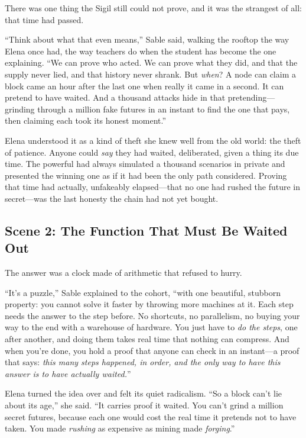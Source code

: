\documentclass[12pt,letterpaper]{book}
\begin{document}
There was one thing the Sigil still could not prove, and it was the strangest of
all: that time had passed.

``Think about what that even means,'' Sable said, walking the rooftop the way Elena
once had, the way teachers do when the student has become the one explaining. ``We
can prove who acted. We can prove what they did, and that the supply never lied, and
that history never shrank. But \emph{when}? A node can claim a block came an hour
after the last one when really it came in a second. It can pretend to have waited.
And a thousand attacks hide in that pretending---grinding through a million fake
futures in an instant to find the one that pays, then claiming each took its honest
moment.''

Elena understood it as a kind of theft she knew well from the old world: the theft
of patience. Anyone could \emph{say} they had waited, deliberated, given a thing its
due time. The powerful had always simulated a thousand scenarios in private and
presented the winning one as if it had been the only path considered. Proving that
time had actually, unfakeably elapsed---that no one had rushed the future in
secret---was the last honesty the chain had not yet bought.

\hypertarget{scene-2-the-function-that-must-be-waited-out}{%
\subsection{Scene 2: The Function That Must Be Waited
Out}\label{scene-2-the-function-that-must-be-waited-out}}

The answer was a clock made of arithmetic that refused to hurry.

``It's a puzzle,'' Sable explained to the cohort, ``with one beautiful, stubborn
property: you cannot solve it faster by throwing more machines at it. Each step
needs the answer to the step before. No shortcuts, no parallelism, no buying your
way to the end with a warehouse of hardware. You just have to \emph{do the steps},
one after another, and doing them takes real time that nothing can compress. And
when you're done, you hold a proof that anyone can check in an instant---a proof
that says: \emph{this many steps happened, in order, and the only way to have this
answer is to have actually waited.}''

Elena turned the idea over and felt its quiet radicalism. ``So a block can't lie
about its age,'' she said. ``It carries proof it waited. You can't grind a million
secret futures, because each one would cost the real time it pretends not to have
taken. You made \emph{rushing} as expensive as mining made \emph{forging}.''
\end{document}
